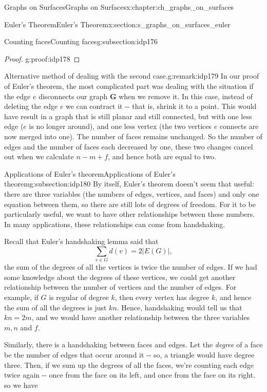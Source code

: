 \documentclass[oneside,10pt,]{book}
\numberwithin{equation}{section}
\newcommand{\bfG}{\mathbf{G}}
\begin{document}
\begin{chapterptx}{Graphs on Surfaces}{}{Graphs on Surfaces}{}{}{x:chapter:ch_graphs_on_surfaces}
\begin{sectionptx}{Euler's Theorem}{}{Euler's Theorem}{}{}{x:section:s_graphs_on_surfaces_euler}
\begin{subsectionptx}{Counting faces}{}{Counting faces}{}{}{g:subsection:idp176}
\begin{proof}{}{g:proof:idp178}
\end{proof}
\begin{remark}{Alternative method of dealing with the second case.}{g:remark:idp179}%
In our proof of Euler's theorem, the most complicated part was dealing with the situation if the edge \(e\) disconnects our graph \(\bfG\) when we remove it. In this case, instead of deleting the edge \(e\) we can contract it -{}-{} that is, shrink it to a point.  This would have result in a graph that is still planar and still connected, but with one less edge (\(e\) is no longer around), and one less vertex (the two vertices \(e\) connects are now merged into one).  The number of faces remains unchanged.  So the number of edges and the number of faces each decreased by one, these two changes cancel out when we calculate \(n-m+f\), and hence both are equal to two.%
\end{remark}
\end{subsectionptx}
%
%
\typeout{************************************************}
\typeout{************************************************}
%
\begin{subsectionptx}{Applications of Euler's theorem}{}{Applications of Euler's theorem}{}{}{g:subsection:idp180}
By itself, Euler's theorem doesn't seem that useful: there are three variables (the numbers of edges, vertices, and faces) and only one equation between them, so there are still lots of degrees of freedom.  For it to be particularly useful, we want to have other relationships between these numbers.  In many applications, these relationships can come from handshaking.%
\par
Recall that Euler's handshaking lemma said that%
\begin{equation*}
\sum_{v\in G} d(v)=2 |E(G)|,
\end{equation*}
the sum of the degrees of all the vertices is twice the number of edges.  If we had some knowledge about the degrees of these vertices, we could get another relationship between the number of vertices and the number of edges.  For example, if \(G\) is regular of degree \(k\), then every vertex has degree \(k\), and hence the sum of all the degrees is just \(kn\).  Hence, handshaking would tell us that \(kn=2m\), and we would have another relationship between the three variables \(m,n\) and \(f\).%
\par
Similarly, there is a handshaking between faces and edges.  Let the \emph{degree} of a face be the number of edges that occur around it -{}-{} so, a triangle would have degree three.  Then, if we sum up the degrees of all the faces, we're counting each edge twice again -{}-{} once from the face on its left, and once from the face on its right.  so we have%

\end{subsectionptx}
\end{sectionptx}
\end{chapterptx}
\end{document}

